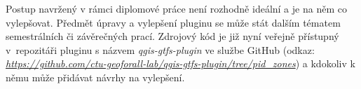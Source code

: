 Postup navržený v rámci diplomové práce není rozhodně ideální a je na něm co vylepšovat. Předmět úpravy a vylepšení pluginu
se může stát dalším tématem semestrálních či závěrečných prací. Zdrojový kód
je již nyní veřejně přístupný v~repozitáři pluginu s názvem \textit{qgis-gtfs-plugin} ve službe GitHub (odkaz: \href{https://github.com/ctu-geoforall-lab/qgis-gtfs-plugin/tree/pid\_zones}{\textit{https://git\-hub.com/ctu-geoforall-lab/qgis-gtfs-plugin/tree/pid\_zones}}) a kdokoliv k němu může přidávat
návrhy na vylepšení.  

